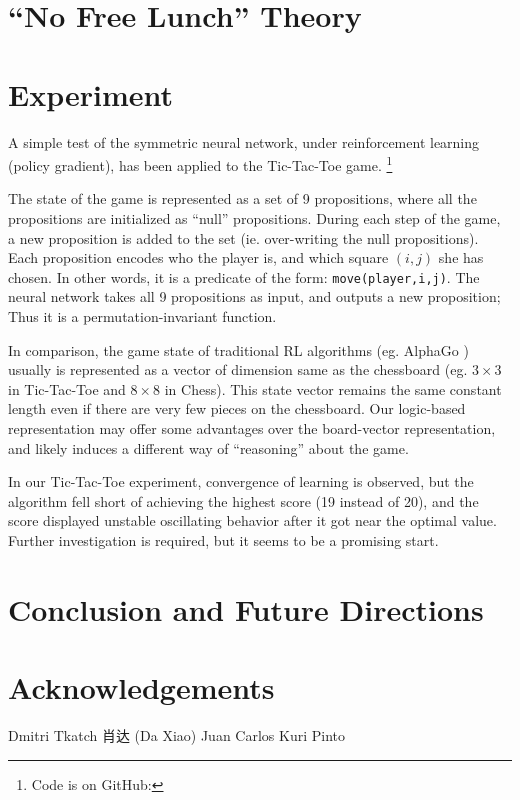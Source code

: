 \documentclass[orivec]{llncs}
\begin{document}
\section{``No Free Lunch'' Theory}

\section{Experiment}

A simple test of the symmetric neural network, under reinforcement learning (policy gradient), has been applied to the Tic-Tac-Toe game. \footnote{ Code is on GitHub: }

The state of the game is represented as a set of 9 propositions, where all the propositions are initialized as ``null'' propositions.  During each step of the game, a new proposition is added to the set (ie. over-writing the null propositions).  Each proposition encodes who the player is, and which square $(i,j)$ she has chosen.  In other words, it is a predicate of the form: \texttt{move(player,i,j)}.  The neural network takes all 9 propositions as input, and outputs a new proposition;  Thus it is a permutation-invariant function.

In comparison, the game state of traditional RL algorithms (eg. AlphaGo \cite{}) usually is represented as a vector of dimension same as the chessboard (eg. $3 \times 3$ in Tic-Tac-Toe and $8 \times 8$ in Chess).  This state vector remains the same constant length even if there are very few pieces on the chessboard.  Our logic-based representation may offer some advantages over the board-vector representation, and likely induces a different way of ``reasoning'' about the game.

In our Tic-Tac-Toe experiment, convergence of learning is observed, but the algorithm fell short of achieving the highest score (19 instead of 20), and the score displayed unstable oscillating behavior after it got near the optimal value.  Further investigation is required, but it seems to be a promising start.

\section{Conclusion and Future Directions}

\section*{Acknowledgements}

\quad Dmitri Tkatch \quad 肖达 (Da Xiao) \quad Juan Carlos Kuri Pinto
\end{document}
